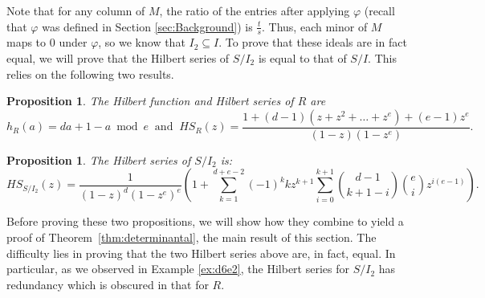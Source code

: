 \documentclass[12pt,reqno]{amsart}
\newtheorem{proposition}[theorem]{Proposition}
\theoremstyle{definition}
\theoremstyle{remark}
\begin{document}
Note that for any column of $M$, the ratio of the entries after applying $\varphi$ (recall that $\varphi$ was defined in Section \ref{sec:Background}) is $\frac{t}{s}$.  Thus, each minor of $M$ maps to $0$ under $\varphi$, so we know that $I_2 \subseteq I$.  To prove that these ideals are in fact equal, we will prove that the Hilbert series of $S/I_2$ is equal to that of $S/I$.  This relies on the following two results.

\begin{proposition}\label{prop:hilbertseriesR}
The Hilbert function and Hilbert series of $R$ are
$$
h_R(a) = da+1-a \bmod e \ \text{ and } \
HS_{R}(z) = \frac{1+(d-1)(z+z^2+\ldots+z^e)+(e-1)z^e}{(1-z)(1-z^e)}.
$$
\end{proposition}

\begin{proposition}\label{prop:hilbseriesI2}
The Hilbert series of $S/I_2$ is:
$$
HS_{S/I_2}(z) = \frac{1}{(1-z)^d(1-z^e)^e}\left( 1+ \sum_{k=1}^{d+e-2} (-1)^k k z^{k+1}\sum_{i=0}^{k+1}{{d-1}\choose{k+1-i}}{e\choose i}z^{i(e-1)}\right).
$$
\end{proposition}

Before proving these two propositions, we will show how they combine to yield a proof of Theorem~\ref{thm:determinantal}, the main result of this section.  The difficulty lies in proving that the two Hilbert series above are, in fact, equal.  In particular, as we observed in Example \ref{ex:d6e2}, the Hilbert series for $S/I_2$ has redundancy which is obscured in that for $R$.
\end{document}
